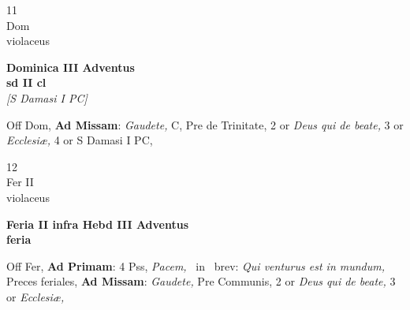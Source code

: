 \documentclass[10pt, openany]{book}
\begin{document}
        \begin{center}
            \begin{minipage}{3.5in}
                \vspace{2em}
                \begin{minipage}{0.5in}
                    {\Huge 11} \\
                    {\normalsize Dom} \\
                    {\normalsize violaceus}
                \end{minipage}
                \begin{minipage}{3.0in}
                    \textbf{ \large Dominica III Adventus \\
                    \textnormal{\normalsize sd II cl}} \\ \textit{[S Damasi I PC]} \\ 
                \end{minipage}
                \begin{justify}Off Dom, \textbf{Ad Missam}: \textit{Gaudete,} C, Pre de Trinitate, 2 or \textit{Deus qui de beate,} 3 or \textit{Ecclesiæ,} 4 or S Damasi I PC,  
                \end{justify}
            \end{minipage}
        \end{center}
    
        \begin{center}
            \begin{minipage}{3.5in}
                \vspace{2em}
                \begin{minipage}{0.5in}
                    {\Huge 12} \\
                    {\normalsize Fer II} \\
                    {\normalsize violaceus}
                \end{minipage}
                \begin{minipage}{3.0in}
                    \textbf{ \large Feria II infra Hebd III Adventus \\
                    \textnormal{\normalsize feria}} \\ 
                \end{minipage}
                \begin{justify}Off Fer, \textbf{Ad Primam}: 4 Pss, \textit{Pacem,} \Vbar\ in \Rbar\ brev: \textit{Qui venturus est in mundum,} Preces feriales, \textbf{Ad Missam}: \textit{Gaudete,} Pre Communis, 2 or \textit{Deus qui de beate,} 3 or \textit{Ecclesiæ,}  
                \end{justify}
            \end{minipage}
        \end{center}
    
\end{document}
